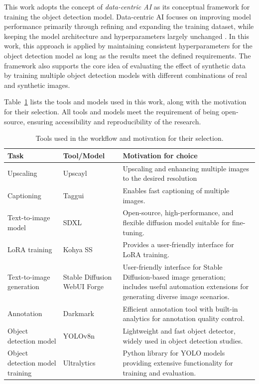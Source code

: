 This work adopts the concept of \textit{data-centric AI} as its conceptual framework for training the object detection model. Data-centric AI focuses on improving model performance primarily through refining and expanding the training dataset, while keeping the model architecture and hyperparameters largely unchanged \cite{data_centric_ai_survey}. In this work, this approach is applied by maintaining consistent hyperparameters for the object detection model as long as the results meet the defined requirements. The framework also supports the core idea of evaluating the effect of synthetic data by training multiple object detection models with different combinations of real and synthetic images.

Table~\ref{tab:used_tools} lists the tools and models used in this work, along with the motivation for their selection. All tools and models meet the requirement of being open-source, ensuring accessibility and reproducibility of the research.

\begin{table}[!h]
        \caption{Tools used in the workflow and motivation for their selection.}
    \label{tab:used_tools}
    \centering
    \begin{tabular}{|p{}|p{}|p{}|}
    \hline
    \textbf{Task} & \textbf{Tool/Model} & \textbf{Motivation for choice} \\ \hline \hline
    Upscaling & Upscayl \cite{upscayl} & Upscaling and enhancing multiple images to the desired resolution \\
    \hline
    Captioning & Taggui \cite{taggui} & Enables fast captioning of multiple images.\\
    \hline
    Text-to-image model & SDXL \cite{sdxlbase} &  Open-source, high-performance, and flexible diffusion model suitable for fine-tuning.\\
    \hline
    LoRA training & Kohya SS \cite{kohya-ss} & Provides a user-friendly interface for LoRA training. \\
    \hline
    Text-to-image generation & Stable Diffusion WebUI Forge \cite{stable-diffusion-webui-forge} & User-friendly interface for Stable Diffusion-based image generation; includes useful automation extensions for generating diverse image scenarios. \\
    \hline
    Annotation & Darkmark \cite{darkmark} & Efficient annotation tool with built-in analytics for annotation quality control. \\
    \hline
    Object detection model & YOLOv8n \cite{yolov8} & Lightweight and fast object detector, widely used in object detection studies. \\
    \hline
    Object detection model training & Ultralytics \cite{ultralytics} & Python library for YOLO models providing extensive functionality for training and evaluation. \\
    \hline
    \end{tabular}
\end{table}



